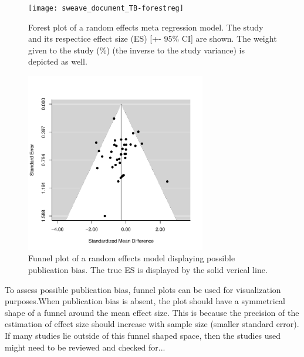 \documentclass[11pt, a4paper]{article}
\begin{document}
\begin{figure}[h!]
\captionsetup{width=0.6\textwidth}
\centering
\texttt{[image: sweave\_document\_TB-forestreg]}
\caption{Forest plot of a random effects meta regression model. The study and its respectice effect size (ES) [+- 95\% CI] are shown. The weight given to the study (\%) (the inverse to the study variance) is depicted as well.}
\label{fig:forestplotreg}
\end{figure}




\begin{figure} [h!]
\captionsetup{width=0.6\textwidth}
\centering
\includegraphics[width=0.7\textwidth]{sweave_document_TB-funnelplot}
\caption{Funnel plot of a random effects model displaying possible publication bias. The true ES is displayed by the solid verical line.}
\end{figure}

To assess possible publication bias, funnel plots can be used for visualization purposes.When publication bias is absent, the plot should have a symmetrical shape of a funnel around the mean effect size. This is because the precision of the estimation of effect size should increase with sample size (smaller standard error). If many studies lie outside of this funnel shaped space, then the studies used might need to be reviewed and checked for...  
\bigskip

\end{document}
